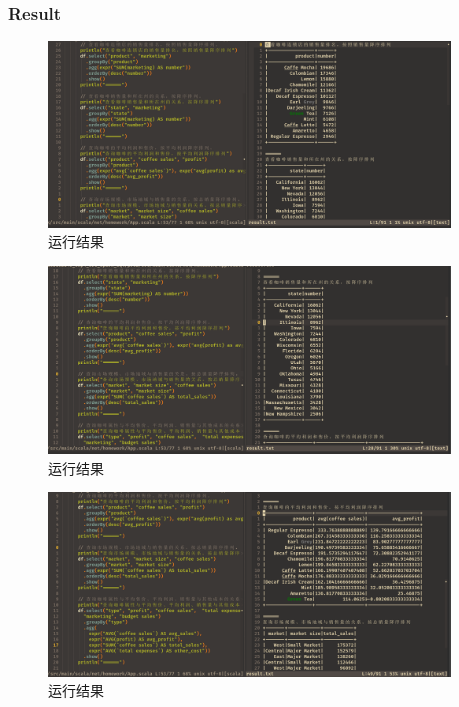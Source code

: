 \documentclass{article}
\begin{document}
\subsubsection{Result}
\begin{figure}[H]
  \begin{center}
    \includegraphics[width=0.95\textwidth]{./figures/2-0.png}
  \end{center}
  \caption{运行结果}
\end{figure}
\begin{figure}[H]
  \begin{center}
    \includegraphics[width=0.95\textwidth]{./figures/2-1.png}
  \end{center}
  \caption{运行结果}
\end{figure}
\begin{figure}[H]
  \begin{center}
    \includegraphics[width=0.95\textwidth]{./figures/2-2.png}
  \end{center}
  \caption{运行结果}
\end{figure}
\end{document}
